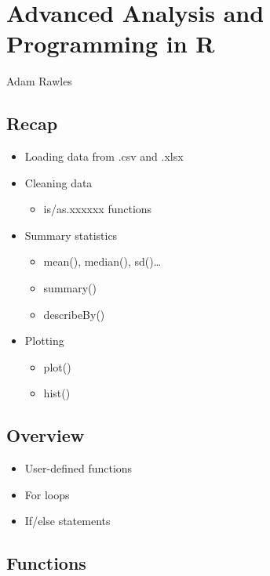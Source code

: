 \documentclass[]{article}
\title{}
\author{}
\date{}
\providecommand{\tightlist}{%
  \setlength{\itemsep}{0pt}\setlength{\parskip}{0pt}}
\begin{document}
\section{Advanced Analysis and Programming in
R}\label{advanced-analysis-and-programming-in-r}

Adam Rawles

\subsection{Recap}\label{recap}

\begin{itemize}
\tightlist
\item
  Loading data from .csv and .xlsx
\item
  Cleaning data

  \begin{itemize}
  \tightlist
  \item
    is/as.xxxxxx functions
  \end{itemize}
\item
  Summary statistics

  \begin{itemize}
  \tightlist
  \item
    mean(), median(), sd()\ldots{}
  \item
    summary()
  \item
    describeBy()
  \end{itemize}
\item
  Plotting

  \begin{itemize}
  \tightlist
  \item
    plot()
  \item
    hist()
  \end{itemize}
\end{itemize}

\subsection{Overview}\label{overview}

\begin{itemize}
\tightlist
\item
  User-defined functions
\item
  For loops
\item
  If/else statements
\end{itemize}

\subsection{Functions}\label{functions}
\end{document}

